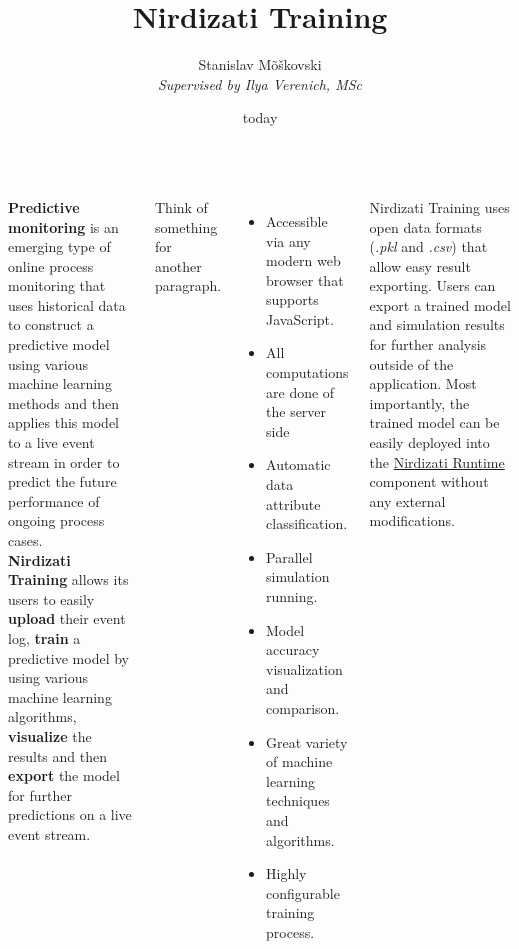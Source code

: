 \documentclass[24pt, a0paper, landscape]{tikzposter}
\title{Nirdizati Training}
\author{Stanislav Mõškovski\\{\small \textit{Supervised by Ilya Verenich, MSc}}}
\date{today}
\institute{Institute of Computer Science, University of Tartu}
\begin{document}
    \maketitle

    \begin{columns}
        {
        \textbf{Predictive monitoring} is an emerging type of online process monitoring that uses historical data to
        construct a predictive model using various machine learning methods and then applies
        this model to a live event stream in order to predict the future performance of ongoing
        process cases. \\
        \textbf{Nirdizati Training} allows its users to easily \textbf{upload} their event log, \textbf{train}
        a predictive model by using various machine learning algorithms, \textbf{visualize} the results
        and then \textbf{export} the model for further predictions on a live event stream.
        }

        {
        Think of something for another paragraph.
        }

        {
        \begin{itemize}
            \item Accessible via any modern web browser that supports JavaScript.
            \item All computations are done of the server side
            \item Automatic data attribute classification.
            \item Parallel simulation running.
            \item Model accuracy visualization and comparison.
            \item Great variety of machine learning techniques and algorithms.
            \item Highly configurable training process.
        \end{itemize}
        }

        {
        Nirdizati Training uses open data formats (\textit{.pkl} and \textit{.csv}) that allow easy result exporting.
        Users can export a trained model and simulation results for further analysis
        outside of the application.
        Most importantly, the trained model can be easily deployed into the \href{http://dashboard.nirdizati.com/}{Nirdizati Runtime}
        component without any external modifications.
        }


\end{columns}
\end{document}
